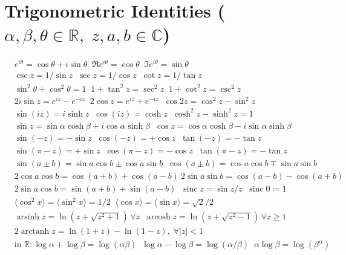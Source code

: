 \section*{Trigonometric Identities \normalfont\scriptsize{($\alpha,\beta,\theta\in\mathbb{R},\; z,a,b\in\mathbb{C}$)}}
\begin{align*}
&e^{i\theta}=\cos\theta+i\sin\theta \;\; \Re e^{i\theta}=\cos\theta \;\; \Im e^{i\theta}=\sin\theta \\
&\csc z=1/\sin z \;\; \sec z=1/\cos z \;\; \cot z=1/\tan z \\
&\sin^2\theta+\cos^2\theta=1 \;\; 1+\tan^2 z=\sec^2 z \;\; 1+\cot^2z=\csc^2z \\
&2i\sin z=e^{iz}-e^{-iz} \;\; 2\cos z=e^{iz}+e^{-iz} \;\; \cos2z=\cos^2 z-\sin^2 z \\
&\sin(iz)=i\sinh z \;\; \cos(iz)=\cosh z \;\; \cosh^2z-\sinh^2z=1 \\
&\sin z=\sin\alpha\cosh\beta+i\cos\alpha\sinh\beta \;\; \cos z=\cos\alpha\cosh\beta-i\sin\alpha\sinh\beta \\
&\sin(-z)=-\sin z \;\; \cos(-z)=+\cos z \;\; \tan(-z)=-\tan z \\
&\sin(\pi-z)=+\sin z \;\; \cos(\pi-z)=-\cos z \;\; \tan(\pi-z)=-\tan z \\
&\sin(a\pm b)=\sin a\cos b\pm\cos a\sin b \;\; \cos(a\pm b)=\cos a\cos b\mp\sin a\sin b \\
&2\cos a\cos b=\cos(a+b)+\cos(a-b) \ 2\sin a\sin b=\cos(a\!-\!b)-\cos(a\!+\!b) \\
&2\sin a\cos b=\sin(a+b)+\sin(a-b) \;\; \operatorname{sinc}z=\sin z/z \;\; \operatorname{sinc}0\coloneqq1 \\
&\langle\cos^2 x\rangle=\langle\sin^2 x\rangle=1/2 \;\; \langle\cos x\rangle=\langle\sin x\rangle=\sqrt{2}/2 \\
&\operatorname{arsinh}z=\ln(z+\sqrt{z^2+1})\, \forall z \;\; \operatorname{arcosh}z=\ln(z+\sqrt{z^2-1})\, \forall z\geq1 \\
&2\operatorname{arctanh}z=\ln(1+z)-\ln(1-z),\; \forall |z|<1 \\
&\text{in } \!\mathbb{R}\!: \log \alpha+\log \beta=\log(\alpha\beta) \;\; \log \alpha-\log \beta=\log(\alpha/\beta) \;\; \alpha\log \beta=\log(\beta^\alpha)  
\end{align*}


